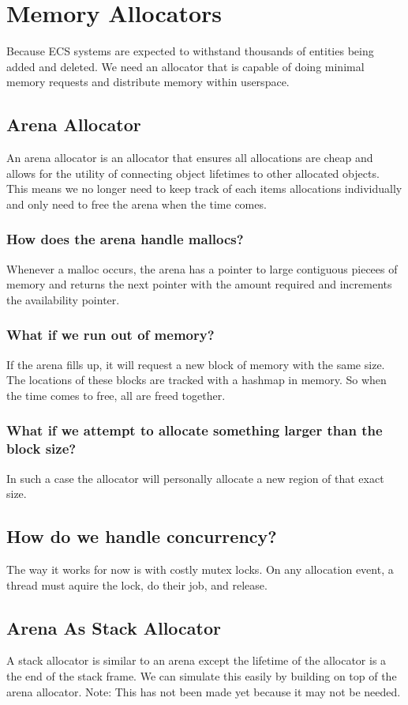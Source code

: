 \section{Memory Allocators}
\label{sec:memory-allocators}

Because ECS systems are expected to withstand thousands of entities being added
and deleted. We need an allocator that is capable of doing minimal memory 
requests and distribute memory within userspace.

\subsection{Arena Allocator}
\label{subsec:arena-allocator}

An arena allocator is an allocator that ensures all allocations are cheap 
and allows for the utility of connecting object lifetimes to other allocated 
objects. This means we no longer need to keep track of each items allocations
individually and only need to free the arena when the time comes.

\subsubsection{How does the arena handle mallocs?}
Whenever a malloc occurs, the arena has a pointer to large contiguous piecees of
memory and returns the next pointer with the amount required and increments the
availability pointer.

\subsubsection{What if we run out of memory?}
If the arena fills up, it will request a new block of memory with the same size.
The locations of these blocks are tracked with a hashmap in memory. So when the
time comes to free, all are freed together. 

\subsubsection{What if we attempt to allocate something larger than the block size?}
In such a case the allocator will personally allocate a new region of that exact size.

\subsection{How do we handle concurrency?}
The way it works for now is with costly mutex locks. On any allocation event, 
a thread must aquire the lock, do their job, and release.

\subsection{Arena As Stack Allocator}
\label{subsec:stack-allocator}

A stack allocator is similar to an arena except the lifetime of the allocator is a the end of the stack frame. We can 
simulate this easily by building on top of the arena allocator. Note: This has not been made yet because it may not be
needed.